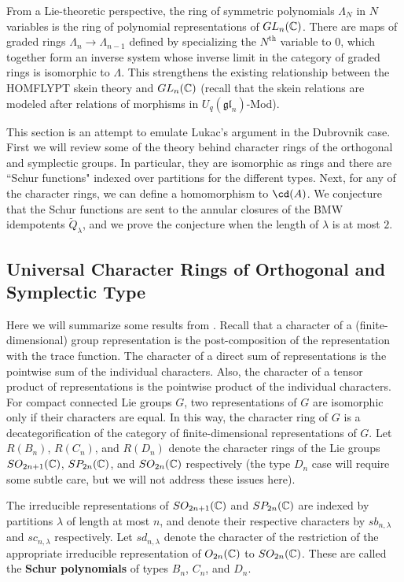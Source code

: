 From a Lie-theoretic perspective, the ring of symmetric polynomials $\Lambda_N$ in $N$ variables is the ring of polynomial representations of $GL_n(\mathbb{C})$. There are maps of graded rings $\Lambda_n \to \Lambda_{n-1}$ defined by specializing the $N^{\mathrm{th}}$ variable to $0$, which together form an inverse system whose inverse limit in the category of graded rings is isomorphic to $\Lambda$. This strengthens the existing relationship between the HOMFLYPT skein theory and $GL_n(\mathbb{C})$ (recall that the skein relations are modeled after relations of morphisms in $U_q(\mathfrak{gl}_n)$-Mod). 

This section is an attempt to emulate Lukac's argument in the Dubrovnik case. First we will review some of the theory behind character rings of the orthogonal and symplectic groups. In particular, they are isomorphic as rings and there are ``Schur functions" indexed over partitions for the different types. Next, for any of the character rings, we can define a homomorphism to $\cd(A)$. We conjecture that the Schur functions are sent to the annular closures of the BMW idempotents $\widetilde{Q}_\lambda$, and we prove the conjecture when the length of $\lambda$ is at most $2$.








\subsection{Universal Character Rings of Orthogonal and Symplectic Type}

Here we will summarize some results from \cite{KT87}. Recall that a character of a (finite-dimensional) group representation is the post-composition of the representation with the trace function. The character of a direct sum of representations is the pointwise sum of the individual characters. Also, the character of a tensor product of representations is the pointwise product of the individual characters. For compact connected Lie groups $G$, two representations of $G$ are isomorphic only if their characters are equal. In this way, the character ring of $G$ is a decategorification of the category of finite-dimensional representations of $G$. Let $R(B_n)$, $R(C_n)$, and $R(D_n)$ denote the character rings of the Lie groups $SO_{2n+1}(\mathbb{C})$, $SP_{2n}(\mathbb{C})$, and $SO_{2n}(\mathbb{C})$ respectively (the type $D_n$ case will require some subtle care, but we will not address these issues here). 

The irreducible representations of $SO_{2n+1}(\mathbb{C})$ and $SP_{2n}(\mathbb{C})$ are indexed by partitions $\lambda$ of length at most $n$, and denote their respective characters by $sb_{n, \lambda}$ and $sc_{n, \lambda}$ respectively. Let $sd_{n, \lambda}$ denote the character of the restriction of the appropriate irreducible representation of $O_{2n}(\mathbb{C})$ to $SO_{2n}(\mathbb{C})$. These are called the \textbf{Schur polynomials} of types $B_n$, $C_n$, and $D_n$.

